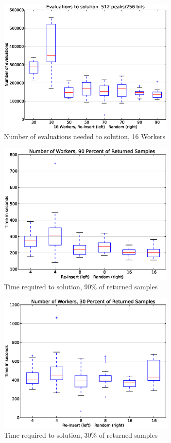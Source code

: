 \documentclass{llncs}
\begin{document}
\begin{figure}[!t]
\centering
\includegraphics[width=3.5in]{16_plot_evals.eps}
\caption{Number of evaluations needed to solution, 16 Workers}
\label{fig:plot_evals_w16}
\end{figure}

\begin{figure}[!t]
\centering
\includegraphics[width=3.5in]{plot_percent_90.eps}
\caption{Time required to solution, 90\% of returned samples}
\label{fig:plot_percent_90}
\end{figure}

\begin{figure}[!t]
\centering
\includegraphics[width=3.5in]{plot_percent_30.eps}
\caption{Time required to solution, 30\% of returned samples}
\label{fig:plot_percent_30}
\end{figure}
\end{document}
